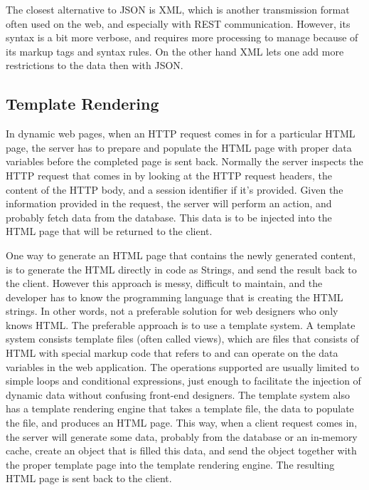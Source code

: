 The closest alternative to JSON is XML,\cite{xml} which is another transmission format often used on the web, and especially with REST communication. However, its syntax is a bit more verbose, and requires more processing to manage because of its markup tags and syntax rules. On the other hand XML lets one add more restrictions to the data then with JSON.

\subsection{Template Rendering}
In dynamic web pages, when an HTTP request comes in for a particular HTML page, the server has to prepare and populate the HTML page with proper data variables before the completed page is sent back. Normally the server inspects the HTTP request that comes in by looking at the HTTP request headers, the content of the HTTP body, and a session identifier if it's provided. Given the information provided in the request, the server will perform an action, and probably fetch data from the database. This data is to be injected into the HTML page that will be returned to the client.

One way to generate an HTML page that contains the newly generated content, is to generate the HTML directly in code as Strings, and send the result back to the client. However this approach is messy, difficult to maintain, and the developer has to know the programming language that is creating the HTML strings. In other words, not a preferable solution for web designers who only knows HTML. The preferable approach is to use a template system. A template system consists template files (often called views), which are files that consists of HTML with special markup code that refers to and can operate on the data variables in the web application. The operations supported are usually limited to simple loops and conditional expressions, just enough to facilitate the injection of dynamic data without confusing front-end designers. The template system also has a template rendering engine that takes a template file, the data to populate the file, and produces an HTML page. This way, when a client request comes in, the server will generate some data, probably from the database or an in-memory cache, create an object that is filled this data, and send the object together with the proper template page into the template rendering engine. The resulting HTML page is sent back to the client. 

